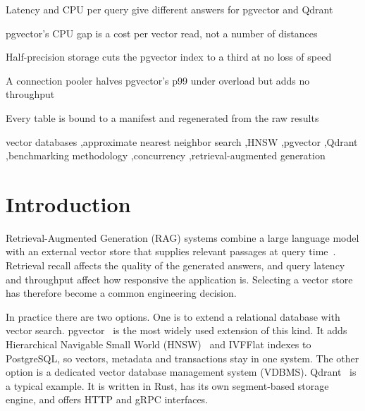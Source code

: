 \documentclass[preprint,12pt]{elsarticle}
\begin{document}
\begin{frontmatter}
\begin{highlights}
\item Latency and CPU per query give different answers for pgvector and Qdrant
\item pgvector's CPU gap is a cost per vector read, not a number of distances
\item Half-precision storage cuts the pgvector index to a third at no loss of speed
\item A connection pooler halves pgvector's p99 under overload but adds no throughput
\item Every table is bound to a manifest and regenerated from the raw results
\end{highlights}

\begin{keyword}
vector databases \sep approximate nearest neighbor search \sep HNSW \sep pgvector \sep Qdrant \sep benchmarking methodology \sep concurrency \sep retrieval-augmented generation
\end{keyword}

\end{frontmatter}

\section{Introduction}

Retrieval-Augmented Generation (RAG) systems combine a large language model with an
external vector store that supplies relevant passages at query time~\cite{pan2024survey}.
Retrieval recall affects the quality of the generated answers, and query latency and
throughput affect how responsive the application is. Selecting a vector store has
therefore become a common engineering decision.

In practice there are two options. One is to extend a relational database with vector
search. pgvector~\cite{pgvector} is the most widely used extension of this kind. It
adds Hierarchical Navigable Small World (HNSW)~\cite{malkov2018} and IVFFlat indexes to
PostgreSQL, so vectors, metadata and transactions stay in one system. The other option
is a dedicated vector database management system (VDBMS). Qdrant~\cite{qdrant} is a
typical example. It is written in Rust, has its own segment-based storage engine, and
offers HTTP and gRPC interfaces.
\end{document}
